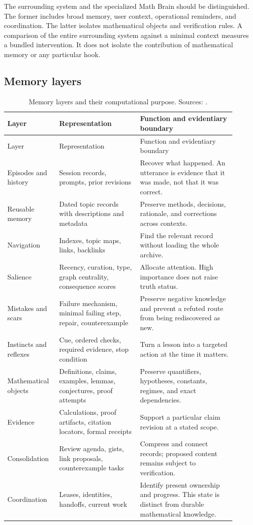 The surrounding system and the specialized Math Brain should be distinguished. The former includes broad memory, user context, operational reminders, and coordination. The latter isolates mathematical objects and verification rules. A comparison of the entire surrounding system against a minimal context measures a bundled intervention. It does not isolate the contribution of mathematical memory or any particular hook.

\subsection{Memory layers}

\begin{longtable}{p{0.20\linewidth}p{0.33\linewidth}p{0.39\linewidth}}
\caption{Memory layers and their computational purpose. Sources: \citep{broadarchitecture,matharchitecture,consciousness,canonical}.}\\
\toprule
Layer & Representation & Function and evidentiary boundary\\
\midrule
\endfirsthead
\toprule Layer & Representation & Function and evidentiary boundary\\ \midrule
\endhead
Episodes and history & Session records, prompts, prior revisions & Recover what happened. An utterance is evidence that it was made, not that it was correct.\\
Reusable memory & Dated topic records with descriptions and metadata & Preserve methods, decisions, rationale, and corrections across contexts.\\
Navigation & Indexes, topic maps, links, backlinks & Find the relevant record without loading the whole archive.\\
Salience & Recency, curation, type, graph centrality, consequence scores & Allocate attention. High importance does not raise truth status.\\
Mistakes and scars & Failure mechanism, minimal failing step, repair, counterexample & Preserve negative knowledge and prevent a refuted route from being rediscovered as new.\\
Instincts and reflexes & Cue, ordered checks, required evidence, stop condition & Turn a lesson into a targeted action at the time it matters.\\
Mathematical objects & Definitions, claims, examples, lemmas, conjectures, proof attempts & Preserve quantifiers, hypotheses, constants, regimes, and exact dependencies.\\
Evidence & Calculations, proof artifacts, citation locators, formal receipts & Support a particular claim revision at a stated scope.\\
Consolidation & Review agenda, gists, link proposals, counterexample tasks & Compress and connect records; proposed content remains subject to verification.\\
Coordination & Leases, identities, handoffs, current work & Identify present ownership and progress. This state is distinct from durable mathematical knowledge.\\
\bottomrule
\end{longtable}

